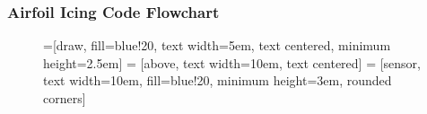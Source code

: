 \documentclass[9pt]{beamer}
\begin{document}
\begin{frame}
\frametitle{Airfoil Icing Code Flowchart}
\label{sec-4-2}

\fontsize{7}\selectfont

\begin{figure}[!ht]
  =[draw, fill=blue!20, text width=5em, 
    text centered, minimum height=2.5em]
   = [above, text width=10em, text centered]
   = [sensor, text width=10em, fill=blue!20, 
    minimum height=3em, rounded corners]
  \vspace*{-1cm}
\end{figure}
\end{frame}
\end{document}
